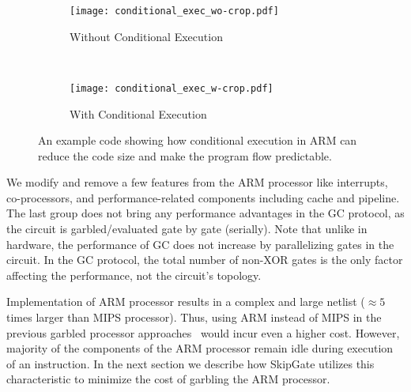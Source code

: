 \begin{figure}[t]
    \centering
    \begin{subfigure}{0.40\columnwidth}
        \centering
        \texttt{[image: conditional\_exec\_wo-crop.pdf]}
        \caption{Without Conditional Execution}
    \end{subfigure}
    ~
    \begin{subfigure}{0.40\columnwidth}
        \centering
        \texttt{[image: conditional\_exec\_w-crop.pdf]}
        \caption{With Conditional Execution}
    \end{subfigure}
    \caption{An example code showing how conditional execution in ARM can reduce the code size and make the program flow predictable.}\label{fig:conditional_exec}
\end{figure}

We modify and remove a few features from the ARM processor like interrupts, co-processors, and performance-related components including cache and pipeline.
The last group does not bring any performance advantages in the GC protocol, as the circuit is garbled/evaluated gate by gate (serially).
Note that unlike in hardware, the performance of GC does not increase by parallelizing gates in the circuit.
In the GC protocol, the total number of non-XOR gates is the only factor affecting the performance, not the circuit's topology.

Implementation of ARM processor results in a complex and large netlist ($\approx 5$ times larger than MIPS processor).
Thus, using ARM instead of MIPS in the previous garbled processor approaches~\cite{wang2015secure, songhori2016garbledcpu} would incur even a higher cost.
However, majority of the components of the ARM processor remain idle during  execution of an instruction.
In the next section we describe how SkipGate utilizes this characteristic to minimize the cost of garbling the ARM processor.

